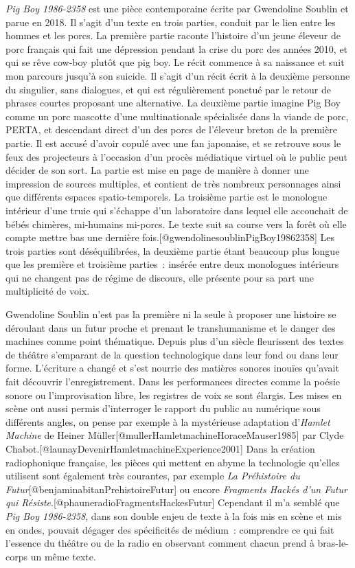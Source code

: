 \documentclass[
]{article}
\begin{document}
\emph{Pig Boy 1986-2358} est une pièce contemporaine écrite par Gwendoline Soublin et parue en 2018. Il s'agit d'un texte en trois parties, conduit par le lien entre les hommes et les porcs. La première partie raconte l'histoire d'un jeune éleveur de porc français qui fait une dépression pendant la crise du porc des années 2010, et qui se rêve cow-boy plutôt que pig boy. Le récit commence à sa naissance et suit mon parcours jusqu'à son suicide. Il s'agit d'un récit écrit à la deuxième personne du singulier, sans dialogues, et qui est régulièrement ponctué par le retour de phrases courtes proposant une alternative. La deuxième partie imagine Pig Boy comme un porc mascotte d'une multinationale spécialisée dans la viande de porc, PERTA, et descendant direct d'un des porcs de l'éleveur breton de la première partie. Il est accusé d'avoir copulé avec une fan japonaise, et se retrouve sous le feux des projecteurs à l'occasion d'un procès médiatique virtuel où le public peut décider de son sort. La partie est mise en page de manière à donner une impression de sources multiples, et contient de très nombreux personnages ainsi que différents espaces spatio-temporels. La troisième partie est le monologue intérieur d'une truie qui s'échappe d'un laboratoire dans lequel elle accouchait de bébés chimères, mi-humains mi-porcs. Le texte suit sa course vers la forêt où elle compte mettre bas une dernière fois.{[}@gwendolinesoublinPigBoy19862358{]} Les trois parties sont déséquilibrées, la deuxième partie étant beaucoup plus longue que les première et troisième parties~: insérée entre deux monologues intérieurs qui ne changent pas de régime de discours, elle présente pour sa part une multiplicité de voix.

Gwendoline Soublin n'est pas la première ni la seule à proposer une histoire se déroulant dans un futur proche et prenant le transhumanisme et le danger des machines comme point thématique. Depuis plus d'un siècle fleurissent des textes de théâtre s'emparant de la question technologique dans leur fond ou dans leur forme. L'écriture a changé et s'est nourrie des matières sonores inouïes qu'avait fait découvrir l'enregistrement. Dans les performances directes comme la poésie sonore ou l'improvisation libre, les registres de voix se sont élargis. Les mises en scène ont aussi permis d'interroger le rapport du public au numérique sous différents angles, on pense par exemple à la mystérieuse adaptation d'\emph{Hamlet Machine} de Heiner Müller{[}@mullerHamletmachineHoraceMauser1985{]} par Clyde Chabot.{[}@launayDevenirHamletmachineExperience2001{]} Dans la création radiophonique française, les pièces qui mettent en abyme la technologie qu'elles utilisent sont également très courantes, par exemple \emph{La Préhistoire du Futur}{[}@benjaminabitanPrehistoireFutur{]} ou encore \emph{Fragments Hackés d'un Futur qui Résiste}.{[}@phauneradioFragmentsHackesFutur{]} Cependant il m'a semblé que \emph{Pig Boy 1986-2358}, dans son double enjeu de texte à la fois mis en scène et mis en ondes, pouvait dégager des spécificités de médium~: comprendre ce qui fait l'essence du théâtre ou de la radio en observant comment chacun prend à bras-le-corps un même texte.
\end{document}
